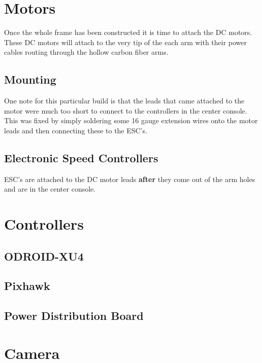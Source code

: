 \documentclass[10pt,notitlepage]{article}
\begin{document}
\section{Motors}
Once the whole frame has been constructed it is time to attach the DC motors. These DC motors will attach to the very tip of the each arm with their power cables routing through the hollow carbon fiber arms.
\subsection{Mounting}
One note for this particular build is that the leads that came attached to the motor were much too short to connect to the controllers in the center console. This was fixed by simply soldering some 16 gauge extension wires onto the motor leads and then connecting these to the ESC's. 
\subsection{Electronic Speed Controllers}
ESC's are attached to the DC motor leads \textbf{after} they come out of the arm holes and are in the center console.

\section{Controllers}
\subsection{ODROID-XU4}
\subsection{Pixhawk}
\subsection{Power Distribution Board}

\section{Camera}
\end{document}
